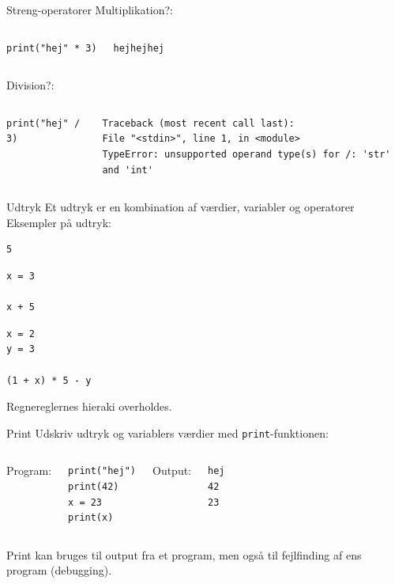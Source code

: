 \documentclass{beamer}
\begin{document}
\begin{frame}[fragile]{Streng-operatorer}
Multiplikation?:
\begin{columns}
\begin{lstlisting}[style=python]
print("hej" * 3)
\end{lstlisting}
\pause
{}
\begin{lstlisting}[style=python]
hejhejhej
\end{lstlisting}
\end{columns}
\pause
Division?:
\begin{columns}
\begin{lstlisting}[style=python]
print("hej" / 3)
\end{lstlisting}
\pause
{}
\begin{lstlisting}[style=python]
Traceback (most recent call last):
File "<stdin>", line 1, in <module>
TypeError: unsupported operand type(s) for /: 'str' and 'int'
\end{lstlisting}
\end{columns}
\end{frame}

\begin{frame}[fragile]{Udtryk}
Et udtryk er en kombination af værdier, variabler og operatorer\\
Eksempler på udtryk:
\begin{lstlisting}[style=python]
5
\end{lstlisting}
\begin{lstlisting}[style=python]
x = 3

x + 5
\end{lstlisting}
\begin{lstlisting}[style=python]
x = 2
y = 3

(1 + x) * 5 - y
\end{lstlisting}
Regnereglernes hieraki overholdes.
\end{frame}

\begin{frame}[fragile]{Print}
Udskriv udtryk og variablers værdier med \texttt{print}-funktionen:
\bigskip
\begin{columns}
Program:
\begin{lstlisting}[style=python]
print("hej")
print(42)
x = 23
print(x)
\end{lstlisting}
Output:
\begin{lstlisting}[style=python]
hej
42
23
\end{lstlisting}
\end{columns}
Print kan bruges til output fra et program, men også til fejlfinding af ens program (debugging).
\end{frame}
\end{document}
